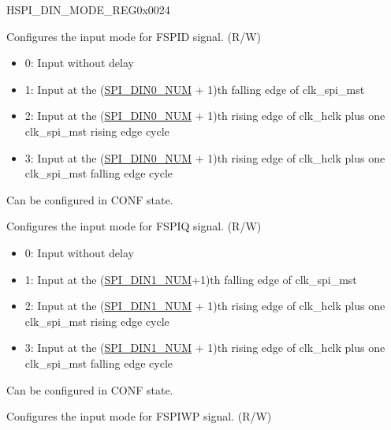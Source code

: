 \begin{register}{H}{SPI\_DIN\_MODE\_REG}{0x0024}\label{regdesc:SPIDINMODEREG}
%
%
%
%
%
%
%
\regnewline%
\begin{regdesc}\begin{reglist}
\label{fielddesc:SPIDIN0MODE}\item [SPI\_DIN0\_MODE] Configures the input mode for FSPID signal. (R/W)\\
\begin{itemize}
    \item 0: Input without delay
    \item 1: Input at the (\hyperref[fielddesc:SPIDIN0NUM]{SPI\_DIN0\_NUM} + 1)th falling edge of clk\_spi\_mst
    \item 2: Input at the (\hyperref[fielddesc:SPIDIN0NUM]{SPI\_DIN0\_NUM} + 1)th rising edge of clk\_hclk plus one clk\_spi\_mst rising edge cycle
    \item 3: Input at the (\hyperref[fielddesc:SPIDIN0NUM]{SPI\_DIN0\_NUM} + 1)th rising edge of clk\_hclk plus one clk\_spi\_mst falling edge cycle
\end{itemize}
Can be configured in CONF state. 
\label{fielddesc:SPIDIN1MODE}\item [SPI\_DIN1\_MODE] Configures the input mode for FSPIQ signal. (R/W)\\
\begin{itemize}
    \item 0: Input without delay
    \item 1: Input at the (\hyperref[fielddesc:SPIDIN1NUM]{SPI\_DIN1\_NUM}+1)th falling edge of clk\_spi\_mst
    \item 2: Input at the (\hyperref[fielddesc:SPIDIN1NUM]{SPI\_DIN1\_NUM} + 1)th rising edge of clk\_hclk plus one clk\_spi\_mst rising edge cycle
    \item 3: Input at the (\hyperref[fielddesc:SPIDIN1NUM]{SPI\_DIN1\_NUM} + 1)th rising edge of clk\_hclk plus one clk\_spi\_mst falling edge cycle
\end{itemize}
 Can be configured in CONF state. 
\label{fielddesc:SPIDIN2MODE}\item [SPI\_DIN2\_MODE] Configures the input mode for FSPIWP signal. (R/W)\\
\begin{itemize}

\end{itemize}
\end{reglist}
\end{regdesc}
\end{register}
